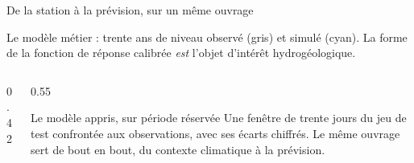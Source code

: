 \documentclass[aspectratio=169,11pt]{beamer}
\begin{document}
\begin{frame}{De la station à la prévision, sur un même ouvrage}

\vspace{0.1cm}
{\scriptsize\color{grisardoise} Le modèle métier : trente ans de niveau observé (gris) et simulé
(cyan). La forme de la fonction de réponse calibrée \emph{est} l'objet d'intérêt
hydrogéologique.\par}

\vspace{0.15cm}
\begin{columns}[T]
\begin{column}{0.42\textwidth}
\end{column}

\begin{column}{0.55\textwidth}
\footnotesize
\begin{apport}{Le modèle appris, sur période réservée}
Une fenêtre de trente jours du jeu de test confrontée aux observations, avec ses écarts chiffrés.
Le même ouvrage sert de bout en bout, du contexte climatique à la prévision.
\end{apport}
\vspace{0.2em}
\end{column}
\end{columns}
\end{frame}
\end{document}
